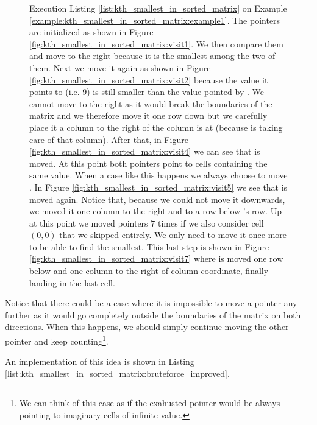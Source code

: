 \begin{figure}
	 \caption[Execution Listing \ref{list:kth_smallest_in_sorted_matrix} on Example \ref{example:kth_smallest_in_sorted_matrix:example1}]{Execution Listing \ref{list:kth_smallest_in_sorted_matrix} on Example \ref{example:kth_smallest_in_sorted_matrix:example1}. The pointers are initialized as shown in Figure \ref{fig:kth_smallest_in_sorted_matrix:visit1}. We then compare them and move  to the right because it is the smallest among the two of them. Next we move it again as shown in Figure \ref{fig:kth_smallest_in_sorted_matrix:visit2} because the value it points to (i.e. $9$) is still smaller than the value pointed by . We cannot move  to the right as it would break the boundaries of the matrix and we therefore move it one row down but we carefully place it a column to the right of the column  is at (because  is taking care of that column). After that, in Figure \ref{fig:kth_smallest_in_sorted_matrix:visit4} we can see that   is moved. At this point both pointers point to cells containing the same value. When a case like this happens we always choose to move . In Figure \ref{fig:kth_smallest_in_sorted_matrix:visit5} we see that  is moved again. Notice that, because we could not move it downwards, we moved it one column to the right and to a row below 's row. Up at this point we moved pointers $7$ times if we also consider cell $(0,0)$ that we skipped entirely. We only need to move it once more to be able to find the  smallest. This last step is shown in Figure \ref{fig:kth_smallest_in_sorted_matrix:visit7} where  is moved one row below and one column to the right of  column coordinate, finally landing in the last cell.}
	  \label{fig:kth_smallest_in_sorted_matrix:visitall}
\end{figure}

Notice that there could be a case where it is impossible to move a pointer any further as it would go completely outside the boundaries of the matrix on both directions. When this happens, we should simply continue moving the other pointer and keep counting\footnote{We can think of this case as if the exahusted pointer would be always pointing to imaginary cells of infinite value.}.

An implementation of this idea is shown in Listing \ref{list:kth_smallest_in_sorted_matrix:bruteforce_improved}.



